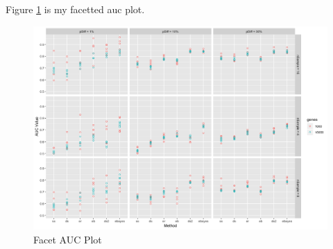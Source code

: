 \documentclass[11pt]{isuthesis}
\begin{document}
Figure \ref{auc} is my facetted auc plot.

\begin{figure}[h!tb] 
\includegraphics[scale=0.40]{facet_auc_plot}
\caption{Facet AUC Plot}
\label{auc}
\end{figure}



%
%


\renewcommand{\bibname}{\centerline{BIBLIOGRAPHY}}
\unappendixtitle
\newpage
{}


\end{document}

